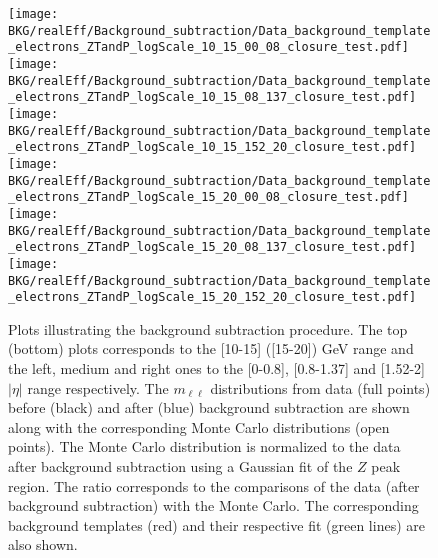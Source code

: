         

\begin{figure}[!htb]
  \begin{center} 
	   \texttt{[image: BKG/realEff/Background\_subtraction/Data\_background\_template\_electrons\_ZTandP\_logScale\_10\_15\_00\_08\_closure\_test.pdf]} 
	   \texttt{[image: BKG/realEff/Background\_subtraction/Data\_background\_template\_electrons\_ZTandP\_logScale\_10\_15\_08\_137\_closure\_test.pdf]} 
	   \texttt{[image: BKG/realEff/Background\_subtraction/Data\_background\_template\_electrons\_ZTandP\_logScale\_10\_15\_152\_20\_closure\_test.pdf]}
	   \texttt{[image: BKG/realEff/Background\_subtraction/Data\_background\_template\_electrons\_ZTandP\_logScale\_15\_20\_00\_08\_closure\_test.pdf]} 
	   \texttt{[image: BKG/realEff/Background\_subtraction/Data\_background\_template\_electrons\_ZTandP\_logScale\_15\_20\_08\_137\_closure\_test.pdf]} 
	   \texttt{[image: BKG/realEff/Background\_subtraction/Data\_background\_template\_electrons\_ZTandP\_logScale\_15\_20\_152\_20\_closure\_test.pdf]}
	   \caption{\label{fig:bkg_templates_closure} Plots illustrating the background subtraction procedure. The top (bottom) plots corresponds to the [10-15] ([15-20]) GeV \pt range and the left, medium and right ones to the [0-0.8], [0.8-1.37] and [1.52-2] $|\eta|$ range respectively. The $m_{\ell\ell}$ distributions from data (full points) before (black) and after (blue) background subtraction are shown along with the corresponding Monte Carlo distributions (open points). The Monte Carlo distribution is normalized to the data after background subtraction using a Gaussian fit of the $Z$ peak region. The ratio corresponds to the comparisons of the data (after background subtraction) with the Monte Carlo. The corresponding background templates (red) and their respective fit (green lines) are also shown.}
  \end{center}
\end{figure}				


